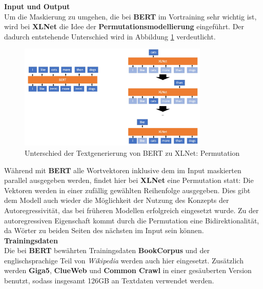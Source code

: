\textbf{Input und Output}\\
Um die Maskierung zu umgehen, die bei \textbf{BERT} im Vortraining sehr wichtig ist, wird bei \textbf{XLNet} die Idee der \textbf{Permutationsmodellierung} eingef\"uhrt. Der dadurch entstehende Unterschied wird in Abbildung \ref{fig:xlnet} verdeutlicht.
\begin{figure}[!ht]
\centering
\includegraphics[height=5cm]{pics/xlnet_vs_bert.png}
\caption{Unterschied der Textgenerierung von BERT zu XLNet: Permutation \cite{xlnetex}}
\label{fig:xlnet}
\end{figure}
W\"ahrend mit \textbf{BERT} alle Wortvektoren inklusive dem im Input maskierten parallel ausgegeben werden, findet hier bei \textbf{XLNet} eine Permutation statt: Die Vektoren werden in einer zuf\"allig gew\"ahlten Reihenfolge ausgegeben. Dies gibt dem Modell auch wieder die M\"oglichkeit der Nutzung des Konzepts der Autoregressivit\"at, das bei fr\"uheren Modellen erfolgreich eingesetzt wurde. Zu der autoregressiven Eigenschaft kommt durch die Permutation eine Bidirektionalit\"at, da W\"orter zu beiden Seiten des n\"achsten im Input sein k\"onnen.\\

\textbf{Trainingsdaten}\\
Die bei \textbf{BERT} bew\"ahrten Trainingsdaten \textbf{BookCorpus} und der englischsprachige Teil von \textit{Wikipedia} werden auch hier eingesetzt. Zus\"atzlich werden \textbf{Giga5}, \textbf{ClueWeb} und \textbf{Common Crawl} in einer ges\"auberten Version benutzt, sodass insgesamt 126GB an Textdaten verwendet werden.

